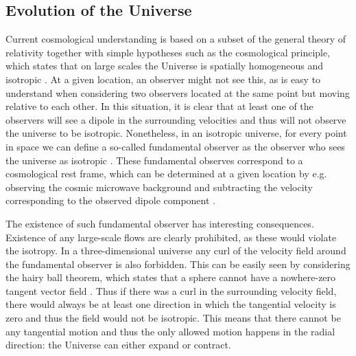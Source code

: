 \documentclass[english, oneside]{HYgradu}
\begin{document}
\subsection{Evolution of the Universe} \label{universe-evolution}

Current cosmological understanding is based on a subset of the general theory of relativity together with simple hypotheses such as the cosmological principle, which states that on large scales the Universe is spatially homogeneous and isotropic \citep{mo2010galaxy}. At a given location, an observer might not see this, as is easy to understand when considering two observers located at the same point but moving relative to each other. In this situation, it is  clear that at least one of the observers will see a dipole in the surrounding velocities and thus will not observe the universe to be isotropic. Nonetheless, in an isotropic universe, for every point in space we can define a so-called fundamental observer as the observer who sees the universe as isotropic \citep{mo2010galaxy}. These fundamental observes correspond to a cosmological rest frame, which can be determined at a given location by e.g. observing the cosmic microwave background and subtracting the velocity corresponding to the observed dipole component \citep{mo2010galaxy}.

The existence of such fundamental observer has interesting consequences. Existence of any large-scale flows are clearly prohibited, as these would violate the isotropy. In a three-dimensional universe any curl of the velocity field around the fundamental observer is also forbidden. This can be easily seen by considering the hairy ball theorem, which states that a sphere cannot have a nowhere-zero tangent vector field \citep{renteln2013manifolds}. Thus if there was a curl in the surrounding velocity field, there would always be at least one direction in which the tangential velocity is zero and thus the field would not be isotropic. This means that there cannot be any tangential motion and thus the only allowed motion happens in the radial direction: the Universe can either expand or contract.
\end{document}
